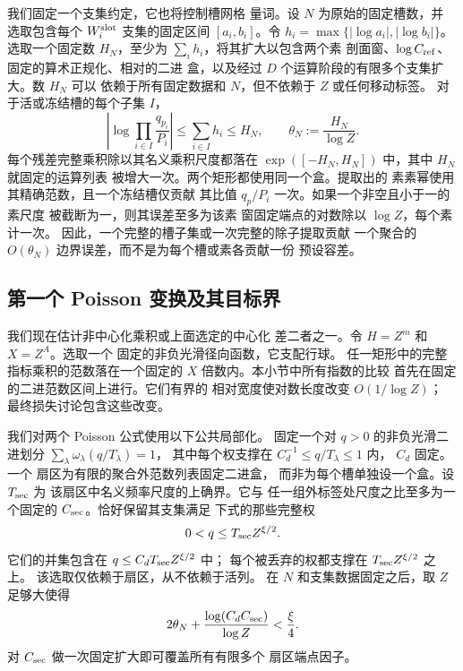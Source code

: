\documentclass[11pt,a4paper]{article}
\numberwithin{equation}{section}
\numberwithin{figure}{section}
\theoremstyle{definition}
\theoremstyle{remark}
\begin{document}
我们固定一个支集约定，它也将控制槽网格
量词。设 \(N\) 为原始的固定槽数，并
选取包含每个 \(W_i^{\rm slot}\) 支集的固定区间 \([a_i,b_i]\)。令
\(h_i=\max\{|\log a_i|,|\log b_i|\}\)。选取一个固定数
\(H_N\)，至少为 \(\sum_i h_i\)，将其扩大以包含两个素
剖面窗、\(\log C_{\rm ref}\)、固定的算术正规化、相对的二进
盒，以及经过 \(D\)
个运算阶段的有限多个支集扩大。数 \(H_N\) 可以
依赖于所有固定数据和 \(N\)，但不依赖于 \(Z\) 或任何移动标签。
对于活或冻结槽的每个子集 \(I\)，
\begin{equation}
 \left|\log\prod_{i\in I}\frac{q_{p_i}}{P_i}\right|
 \le\sum_{i\in I}h_i\le H_N,
 \qquad \theta_N:=\frac{H_N}{\log Z}.
 \label{eq:centered-aggregate-support}
\end{equation}
每个残差完整乘积除以其名义乘积尺度都落在
\(\exp([-H_N,H_N])\) 中，其中 \(H_N\) 就固定的运算列表
被增大一次。两个矩形都使用同一个盒。提取出的
素素幂使用其精确范数，且一个冻结槽仅贡献
其比值 \(q_p/P_i\) 一次。如果一个非空且小于一的素尺度
被截断为一，则其误差至多为该素
窗固定端点的对数除以 \(\log Z\)，每个素计一次。
因此，一个完整的槽子集或一次完整的除子提取贡献
一个聚合的 \(O(\theta_N)\) 边界误差，而不是为每个槽或素各贡献一份
预设容差。

\subsection{第一个 Poisson 变换及其目标界}\label{sec:plain-first-transform}

我们现在估计非中心化乘积或上面选定的中心化
差二者之一。令 \(H=Z^m\) 和 \(X=Z^A\)。选取一个
固定的非负光滑径向函数，它支配行球。
任一矩形中的完整指标乘积的范数落在一个固定的
\(X\) 倍数内。本小节中所有指数的比较
首先在固定的二进范数区间上进行。它们有界的
相对宽度使对数长度改变 \(O(1/\log Z)\)；
最终损失讨论包含这些改变。

我们对两个 Poisson 公式使用以下公共局部化。
固定一个对 \(q>0\) 的非负光滑二进划分
\(\sum_\lambda\omega_\lambda(q/T_\lambda)=1\)，
其中每个权支撑在 \(C_d^{-1}\le q/T_\lambda\le1\) 内，
\(C_d\) 固定。一个
扇区为有限的聚合外范数列表固定二进盒，
而非为每个槽单独设一个盒。设 \(T_{\rm sec}\) 为
该扇区中名义频率尺度的上确界。它与
任一组外标签处尺度之比至多为一个固定的
\(C_{\rm sec}\)。恰好保留其支集满足
下式的那些完整权
\[
 0<q\le T_{\rm sec}Z^{\xi/2}.
\]
它们的并集包含在 \(q\le C_dT_{\rm sec}Z^{\xi/2}\) 中；
每个被丢弃的权都支撑在 \(T_{\rm sec}Z^{\xi/2}\) 之上。
该选取仅依赖于扇区，从不依赖于活列。
在 \(N\) 和支集数据固定之后，取 \(Z\) 足够大使得
\begin{equation}
 2\theta_N+\frac{\log(C_dC_{\rm sec})}{\log Z}<\frac\xi4.
 \label{eq:centered-localization-threshold}
\end{equation}
对 \(C_{\rm sec}\) 做一次固定扩大即可覆盖所有有限多个
扇区端点因子。
\end{document}

